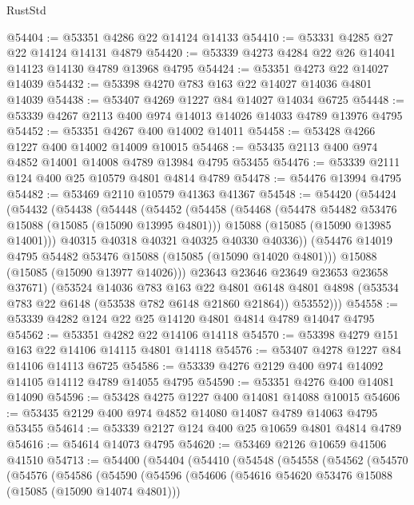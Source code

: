 \begin{lexlean}{RustStd}
\begin{coremodule}
@54404 := @53351 @4286 @22 @14124 @14133
@54410 := @53331 @4285 @27 @22 @14124 @14131 @4879
@54420 := @53339 @4273 @4284 @22 @26 @14041 @14123 @14130 @4789 @13968 @4795
@54424 := @53351 @4273 @22 @14027 @14039
@54432 := @53398 @4270 @783 @163 @22 @14027 @14036 @4801 @14039
@54438 := @53407 @4269 @1227 @84 @14027 @14034 @6725
@54448 := @53339 @4267 @2113 @400 @974 @14013 @14026 @14033 @4789 @13976 @4795
@54452 := @53351 @4267 @400 @14002 @14011
@54458 := @53428 @4266 @1227 @400 @14002 @14009 @10015
@54468 := @53435 @2113 @400 @974 @4852 @14001 @14008 @4789 @13984 @4795 @53455
@54476 := @53339 @2111 @124 @400 @25 @10579 @4801 @4814 @4789
@54478 := @54476 @13994 @4795
@54482 := @53469 @2110 @10579 @41363 @41367
@54548 := @54420
    (@54424
      (@54432
        (@54438
          (@54448
            (@54452
              (@54458
                (@54468
                  (@54478 @54482 @53476 @15088 (@15085 (@15090 @13995 @4801)))
                  @15088
                  (@15085 (@15090 @13985 @14001)))
                @40315
                @40318
                @40321
                @40325
                @40330
                @40336))
            (@54476 @14019 @4795 @54482 @53476 @15088 (@15085 (@15090 @14020 @4801)))
            @15088
            (@15085 (@15090 @13977 @14026)))
          @23643
          @23646
          @23649
          @23653
          @23658
          @37671)
        (@53524
          @14036
          @783
          @163
          @22
          @4801
          @6148
          @4801
          @4898
          (@53534 @783 @22 @6148 (@53538 @782 @6148 @21860 @21864))
          @53552)))
@54558 := @53339 @4282 @124 @22 @25 @14120 @4801 @4814 @4789 @14047 @4795
@54562 := @53351 @4282 @22 @14106 @14118
@54570 := @53398 @4279 @151 @163 @22 @14106 @14115 @4801 @14118
@54576 := @53407 @4278 @1227 @84 @14106 @14113 @6725
@54586 := @53339 @4276 @2129 @400 @974 @14092 @14105 @14112 @4789 @14055 @4795
@54590 := @53351 @4276 @400 @14081 @14090
@54596 := @53428 @4275 @1227 @400 @14081 @14088 @10015
@54606 := @53435 @2129 @400 @974 @4852 @14080 @14087 @4789 @14063 @4795 @53455
@54614 := @53339 @2127 @124 @400 @25 @10659 @4801 @4814 @4789
@54616 := @54614 @14073 @4795
@54620 := @53469 @2126 @10659 @41506 @41510
@54713 := @54400
    (@54404
      (@54410
        (@54548
          (@54558
            (@54562
              (@54570
                (@54576
                  (@54586
                    (@54590
                      (@54596
                        (@54606
                          (@54616 @54620 @53476 @15088 (@15085 (@15090 @14074 @4801)))

\end{coremodule}
\end{lexlean}
